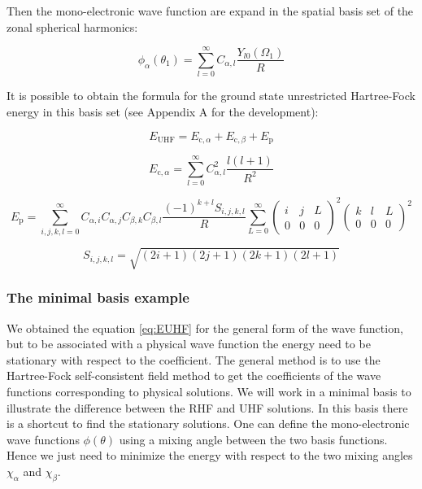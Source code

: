 \documentclass[11pt,a4paper]{article}
\begin{document}
{Then the mono-electronic wave function are expand in the spatial basis set of the zonal spherical harmonics:

\begin{equation}
\phi_\alpha(\theta_1)=\sum\limits_{l=0}^{\infty}C_{\alpha,l}\frac{Y_{l0}(\Omega_1)}{R}
\end{equation}

It is possible to obtain the formula for the ground state unrestricted Hartree-Fock energy in this basis set (see Appendix A for the development):

\begin{equation}
E_{\text{UHF}} = E_{\text{c},\alpha} + E_{\text{c},\beta} + E_{\text{p}}
\end{equation}

\begin{equation}
E_{\text{c},\alpha} = \sum\limits_{l=0}^{\infty} C_{\alpha,l}^2 \frac{l(l+1)}{R^2}
\end{equation}

\begin{equation}
E_{\text{p}} = \sum\limits_{i,j,k,l=0}^{\infty}C_{\alpha,i}C_{\alpha,j}C_{\beta,k}C_{\beta,l} \frac{(-1)^{k+l}S_{i,j,k,l}}{R}\sum\limits_{L=0}^{\infty} \begin{pmatrix}
 i & j & L \\
 0 & 0 & 0
\end{pmatrix}^2 \begin{pmatrix}
 k & l & L \\
 0 & 0 & 0
\end{pmatrix}^2
\label{eq:EUHF}
\end{equation}

\begin{equation*}
S_{i,j,k,l}=\sqrt{(2i+1)(2j+1)(2k+1)(2l+1)}
\end{equation*}

\subsubsection{The minimal basis example}

We obtained the equation \eqref{eq:EUHF} for the general form of the wave function, but to be associated with a physical wave function the energy need to be stationary with respect to the coefficient. The general method is to use the Hartree-Fock self-consistent field method to get the coefficients of the wave functions corresponding to physical solutions. We will work in a minimal basis to illustrate the difference between the RHF and UHF solutions. In this basis there is a shortcut to find the stationary solutions. One can define the mono-electronic wave functions $\phi(\theta)$ using a mixing angle between the two basis functions. Hence we just need to minimize the energy with respect to the two mixing angles $\chi_\alpha$ and $\chi_\beta$.

}
\end{document}
